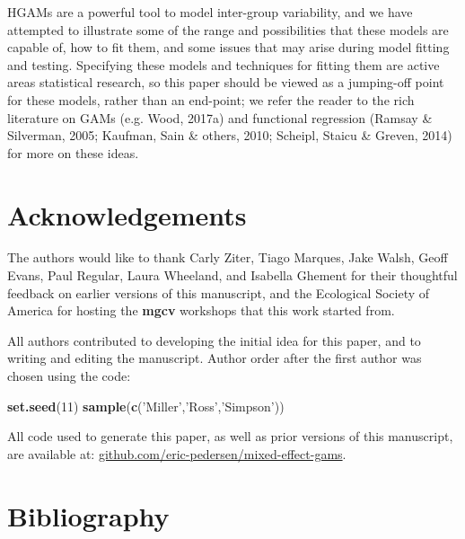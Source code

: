 \documentclass[12pt]{article}
\newenvironment{Shaded}{\begin{snugshade}}{\end{snugshade}}
\newcommand{\KeywordTok}[1]{\textcolor[rgb]{0.13,0.29,0.53}{\textbf{#1}}}
\newcommand{\DecValTok}[1]{\textcolor[rgb]{0.00,0.00,0.81}{#1}}
\newcommand{\StringTok}[1]{\textcolor[rgb]{0.31,0.60,0.02}{#1}}
\newcommand{\NormalTok}[1]{#1}
\begin{document}
HGAMs are a powerful tool to model inter-group variability, and we have
attempted to illustrate some of the range and possibilities that these
models are capable of, how to fit them, and some issues that may arise
during model fitting and testing. Specifying these models and techniques
for fitting them are active areas statistical research, so this paper
should be viewed as a jumping-off point for these models, rather than an
end-point; we refer the reader to the rich literature on GAMs (e.g.
Wood, 2017a) and functional regression (Ramsay \& Silverman, 2005;
Kaufman, Sain \& others, 2010; Scheipl, Staicu \& Greven, 2014) for more
on these ideas.

\section{Acknowledgements}\label{acknowledgements}

The authors would like to thank Carly Ziter, Tiago Marques, Jake Walsh,
Geoff Evans, Paul Regular, Laura Wheeland, and Isabella Ghement for
their thoughtful feedback on earlier versions of this manuscript, and
the Ecological Society of America for hosting the \textbf{mgcv}
workshops that this work started from.

All authors contributed to developing the initial idea for this paper,
and to writing and editing the manuscript. Author order after the first
author was chosen using the code:

\begin{Shaded}
\begin{Highlighting}[]
\KeywordTok{set.seed}\NormalTok{(}\DecValTok{11}\NormalTok{)}
\KeywordTok{sample}\NormalTok{(}\KeywordTok{c}\NormalTok{(}\StringTok{'Miller'}\NormalTok{,}\StringTok{'Ross'}\NormalTok{,}\StringTok{'Simpson'}\NormalTok{))}
\end{Highlighting}
\end{Shaded}

All code used to generate this paper, as well as prior versions of this
manuscript, are available at:
\href{https://github.com/eric-pedersen/mixed-effect-gams}{github.com/eric-pedersen/mixed-effect-gams}.

\FloatBarrier

\section*{Bibliography}\label{bibliography}
\end{document}
